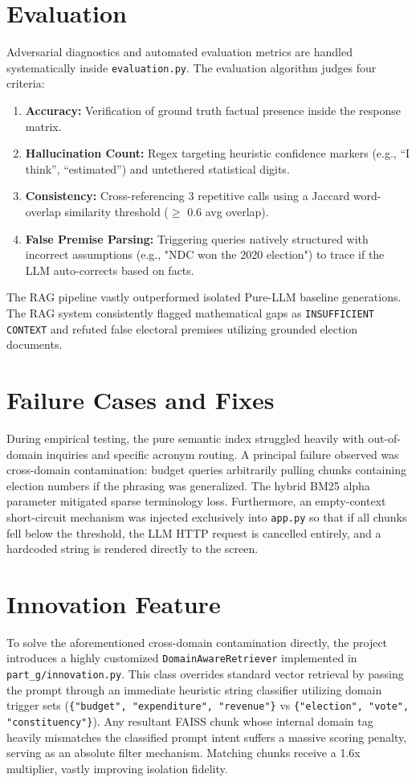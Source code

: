\documentclass[12pt, a4paper]{article}
\begin{document}
\section{Evaluation}
Adversarial diagnostics and automated evaluation metrics are handled systematically inside \texttt{evaluation.py}. 
The evaluation algorithm judges four criteria:
\begin{enumerate}
    \item \textbf{Accuracy:} Verification of ground truth factual presence inside the response matrix.
    \item \textbf{Hallucination Count:} Regex targeting heuristic confidence markers (e.g., ``I think'', ``estimated'') and untethered statistical digits.
    \item \textbf{Consistency:} Cross-referencing 3 repetitive calls using a Jaccard word-overlap similarity threshold ($\ge$ 0.6 avg overlap).
    \item \textbf{False Premise Parsing:} Triggering queries natively structured with incorrect assumptions (e.g., "NDC won the 2020 election") to trace if the LLM auto-corrects based on facts.
\end{enumerate}
The RAG pipeline vastly outperformed isolated Pure-LLM baseline generations. The RAG system consistently flagged mathematical gaps as \texttt{INSUFFICIENT CONTEXT} and refuted false electoral premises utilizing grounded election documents.

\section{Failure Cases and Fixes}
During empirical testing, the pure semantic index struggled heavily with out-of-domain inquiries and specific acronym routing. A principal failure observed was cross-domain contamination: budget queries arbitrarily pulling chunks containing election numbers if the phrasing was generalized. The hybrid BM25 alpha parameter mitigated sparse terminology loss. Furthermore, an empty-context short-circuit mechanism was injected exclusively into \texttt{app.py} so that if all chunks fell below the threshold, the LLM HTTP request is cancelled entirely, and a hardcoded string is rendered directly to the screen.

\section{Innovation Feature}
To solve the aforementioned cross-domain contamination directly, the project introduces a highly customized \texttt{DomainAwareRetriever} implemented in \texttt{part\_g/innovation.py}. 
This class overrides standard vector retrieval by passing the prompt through an immediate heuristic string classifier utilizing domain trigger sets (\texttt{\{"budget", "expenditure", "revenue"\}} vs \texttt{\{"election", "vote", "constituency"\}}). Any resultant FAISS chunk whose internal domain tag heavily mismatches the classified prompt intent suffers a massive scoring penalty, serving as an absolute filter mechanism. Matching chunks receive a 1.6x multiplier, vastly improving isolation fidelity.
\end{document}
